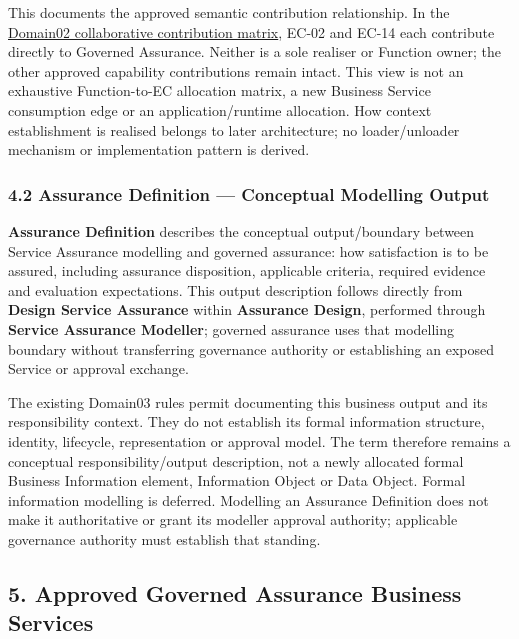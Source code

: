 This documents the approved semantic contribution relationship. In the \hyperref[rad:assurance-strategy:54]{Domain02 collaborative contribution matrix}, EC-02 and EC-14 each contribute directly to Governed Assurance. Neither is a sole realiser or Function owner; the other approved capability contributions remain intact. This view is not an exhaustive Function-to-EC allocation matrix, a new Business Service consumption edge or an application/\allowbreak{}runtime allocation. How context establishment is realised belongs to later architecture; no loader/\allowbreak{}unloader mechanism or implementation pattern is derived.

\label{rad:assurance:150}
\subsubsection*{4.2 Assurance Definition — Conceptual Modelling Output}
\label{rad:assurance:152}

\textbf{Assurance Definition} describes the conceptual output/\allowbreak{}boundary between Service Assurance modelling and governed assurance: how satisfaction is to be assured, including assurance disposition, applicable criteria, required evidence and evaluation expectations. This output description follows directly from \textbf{Design Service Assurance} within \textbf{Assurance Design}, performed through \textbf{Service Assurance Modeller}; governed assurance uses that modelling boundary without transferring governance authority or establishing an exposed Service or approval exchange.

\label{rad:assurance:154}

The existing Domain03 rules permit documenting this business output and its responsibility context. They do not establish its formal information structure, identity, lifecycle, representation or approval model. The term therefore remains a conceptual responsibility/\allowbreak{}output description, not a newly allocated formal Business Information element, Information Object or Data Object. Formal information modelling is deferred. Modelling an Assurance Definition does not make it authoritative or grant its modeller approval authority; applicable governance authority must establish that standing.

\label{rad:assurance:156}
\subsection*{5. Approved Governed Assurance Business Services}
\label{rad:assurance:158}

